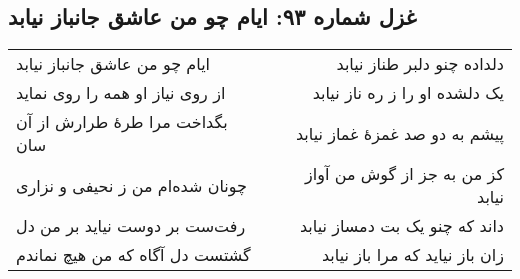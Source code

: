 \begin{center}
\section*{غزل شماره ۹۳: ایام چو من عاشق جانباز نیابد}
\label{sec:093}
\begin{longtable}{l p{0.5cm} r}
ایام چو من عاشق جانباز نیابد
&&
دلداده چنو دلبر طناز نیابد
\\
از روی نیاز او همه را روی نماید
&&
یک دلشده او را ز ره ناز نیابد
\\
بگداخت مرا طرهٔ طرارش از آن سان
&&
پیشم به دو صد غمزهٔ غماز نیابد
\\
چونان شده‌ام من ز نحیفی و نزاری
&&
کز من به جز از گوش من آواز نیابد
\\
رفت‌ست بر دوست نیاید بر من دل
&&
داند که چنو یک بت دمساز نیابد
\\
گشتست دل آگاه که من هیچ نماندم
&&
زان باز نیاید که مرا باز نیابد
\\
\end{longtable}
\end{center}
